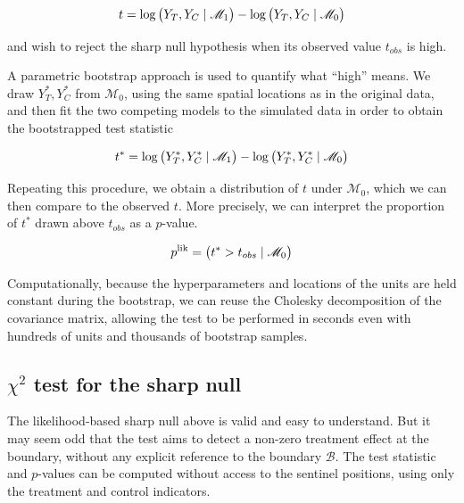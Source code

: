 \documentclass[letter]{article}
\let\Pr\relax
\DeclareMathOperator{\Pr}{\mathbb{P}}
\newcommand{\boundary}{\mathcal{B}}
\newcommand{\modnull}{\mathscr{M}_0}
\newcommand{\modalt}{\mathscr{M}_1}
\begin{document}
\begin{equation}
    t = \log \Pr\del{Y_T, Y_C \mid \modalt} - \log \Pr\del{Y_T, Y_C \mid \modnull}
\end{equation}

and wish to reject the sharp null hypothesis when its observed value \(t_{obs}\) is high.

A parametric bootstrap approach is used to quantify what ``high'' means. We draw \(Y_T^*,Y_C^*\) from \(\modnull\),
using the same spatial locations as in the original data,
and then fit the two competing models to the simulated data in order to obtain the bootstrapped test statistic

\begin{equation}
    t^* = \log \Pr\del{Y_T^*, Y_C^* \mid \modalt} - \log \Pr\del{Y_T^*, Y_C^* \mid \modnull}
\end{equation}

Repeating this procedure, we obtain a distribution of \(t\) under \(\modnull\),
which we can then compare to the observed \(t\).
More precisely, we can interpret the proportion of \(t^*\) drawn above \(t_{obs}\) as a \(p\)-value.

\begin{equation}
    p^{\mathrm{lik}} = \Pr\del{t^* > t_{obs} \mid \modnull}
\end{equation}

Computationally, because the hyperparameters and locations of the units are held constant during the bootstrap, we can reuse the Cholesky decomposition of the covariance matrix, allowing the test to be performed in seconds even with hundreds of units and thousands of bootstrap samples.
    


    	\subsection{\texorpdfstring{\(\chi^2\) test for the sharp null}{\textbackslash{}chi\^{}2 test for the sharp null}}\label{chi2-test-for-the-sharp-null}

The likelihood-based sharp null above is valid and easy to understand.
But it may seem odd that the test aims to detect a non-zero treatment effect at the boundary, without any explicit reference to the boundary \(\boundary\). The test statistic and \(p\)-values can be computed without access to the sentinel positions, using only the treatment and control indicators.
\end{document}

